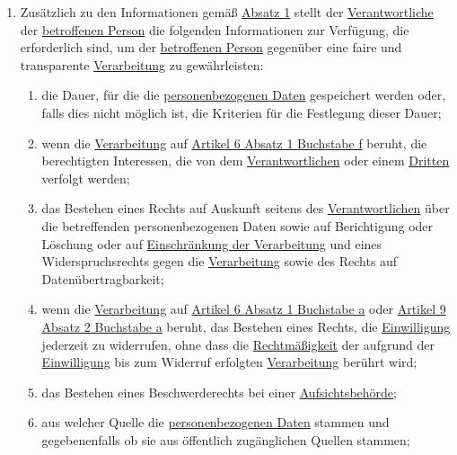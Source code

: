 \begin{enumerate}
\begin{enumerate}
  \end{enumerate}

  \item Zusätzlich zu den Informationen gemäß \hyperref[itm:14-1]{Absatz 1} stellt der \hyperref[itm:04-7]
   {Verantwortliche} der \hyperref[itm:04-1]{betroffenen Person} die folgenden Informationen zur Verfügung, die
   erforderlich sind, um der \hyperref[itm:04-1]{betroffenen Person} gegenüber eine faire und transparente \hyperref
   [itm:04-2]{Verarbeitung} zu gewährleisten:
  \label{itm:14-2}

  \begin{enumerate}
  
    \item die Dauer, für die die \hyperref[itm:04-1]{personenbezogenen Daten} gespeichert werden oder, falls dies nicht
     möglich ist, die Kriterien für die Festlegung dieser Dauer;
    \label{itm:14-2a}

    \item wenn die \hyperref[itm:04-2]{Verarbeitung} auf \hyperref[itm:06-1f]{Artikel 6 Absatz 1 Buchstabe f} beruht,
     die berechtigten Interessen, die von dem \hyperref[itm:04-7]{Verantwortlichen} oder einem \hyperref[itm:04-10]
     {Dritten} verfolgt werden;
    \label{itm:14-2b}

    \item das Bestehen eines Rechts auf Auskunft seitens des \hyperref[itm:04-7]{Verantwortlichen} über die betreffenden
     personenbezogenen Daten sowie auf Berichtigung oder Löschung oder auf \hyperref[itm:04-3]{Einschränkung der
     Verarbeitung} und eines Widerspruchsrechts gegen die \hyperref[itm:04-2]{Verarbeitung} sowie des Rechts auf
     Datenübertragbarkeit;
    \label{itm:14-2c}

    \item wenn die \hyperref[itm:04-2]{Verarbeitung} auf \hyperref[itm:06-1a]{Artikel 6 Absatz 1 Buchstabe a}
     oder \hyperref[itm:09-2a]{Artikel 9 Absatz 2 Buchstabe a} beruht, das Bestehen eines Rechts, die \hyperref
     [itm:04-11]{Einwilligung} jederzeit zu widerrufen, ohne dass die \hyperref[itm:05-1a]{Rechtmäßigkeit} der aufgrund
     der \hyperref[itm:04-11]{Einwilligung} bis zum Widerruf erfolgten \hyperref[itm:04-2]{Verarbeitung} berührt wird;
    \label{itm:14-2d}

    \item das Bestehen eines Beschwerderechts bei einer \hyperref[itm:04-21]{Aufsichtsbehörde};
    \label{itm:14-2e}

    \item aus welcher Quelle die \hyperref[itm:04-1]{personenbezogenen Daten} stammen und gegebenenfalls ob sie aus
     öffentlich zugänglichen Quellen stammen;
    \label{itm:14-2f}


\end{enumerate}
\end{enumerate}
